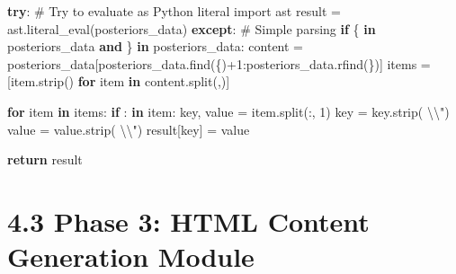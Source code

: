 \documentclass[
  11pt,
  letterpaper,
]{book}
\newenvironment{Shaded}{\begin{snugshade}}{\end{snugshade}}
\newcommand{\CharTok}[1]{\textcolor[rgb]{0.13,0.47,0.30}{#1}}
\newcommand{\CommentTok}[1]{\textcolor[rgb]{0.37,0.37,0.37}{#1}}
\newcommand{\ControlFlowTok}[1]{\textcolor[rgb]{0.00,0.23,0.31}{\textbf{#1}}}
\newcommand{\DecValTok}[1]{\textcolor[rgb]{0.68,0.00,0.00}{#1}}
\newcommand{\ImportTok}[1]{\textcolor[rgb]{0.00,0.46,0.62}{#1}}
\newcommand{\KeywordTok}[1]{\textcolor[rgb]{0.00,0.23,0.31}{\textbf{#1}}}
\newcommand{\NormalTok}[1]{\textcolor[rgb]{0.00,0.23,0.31}{#1}}
\newcommand{\OperatorTok}[1]{\textcolor[rgb]{0.37,0.37,0.37}{#1}}
\newcommand{\StringTok}[1]{\textcolor[rgb]{0.13,0.47,0.30}{#1}}
\begin{document}
\begin{Shaded}
\begin{Highlighting}[]
        \ControlFlowTok{try}\NormalTok{:}
            \CommentTok{\# Try to evaluate as Python literal}
            \ImportTok{import}\NormalTok{ ast}
\NormalTok{            result }\OperatorTok{=}\NormalTok{ ast.literal\_eval(posteriors\_data)}
        \ControlFlowTok{except}\NormalTok{:}
            \CommentTok{\# Simple parsing}
            \ControlFlowTok{if} \StringTok{\textquotesingle{}\{\textquotesingle{}} \KeywordTok{in}\NormalTok{ posteriors\_data }\KeywordTok{and} \StringTok{\textquotesingle{}\}\textquotesingle{}} \KeywordTok{in}\NormalTok{ posteriors\_data:}
\NormalTok{                content }\OperatorTok{=}\NormalTok{ posteriors\_data[posteriors\_data.find(}\StringTok{\textquotesingle{}\{\textquotesingle{}}\NormalTok{)}\OperatorTok{+}\DecValTok{1}\NormalTok{:posteriors\_data.rfind(}\StringTok{\textquotesingle{}\}\textquotesingle{}}\NormalTok{)]}
\NormalTok{                items }\OperatorTok{=}\NormalTok{ [item.strip() }\ControlFlowTok{for}\NormalTok{ item }\KeywordTok{in}\NormalTok{ content.split(}\StringTok{\textquotesingle{},\textquotesingle{}}\NormalTok{)]}

                \ControlFlowTok{for}\NormalTok{ item }\KeywordTok{in}\NormalTok{ items:}
                    \ControlFlowTok{if} \StringTok{\textquotesingle{}:\textquotesingle{}} \KeywordTok{in}\NormalTok{ item:}
\NormalTok{                        key, value }\OperatorTok{=}\NormalTok{ item.split(}\StringTok{\textquotesingle{}:\textquotesingle{}}\NormalTok{, }\DecValTok{1}\NormalTok{)}
\NormalTok{                        key }\OperatorTok{=}\NormalTok{ key.strip(}\StringTok{\textquotesingle{} }\CharTok{\textbackslash{}\textquotesingle{}\textbackslash{}"}\StringTok{\textquotesingle{}}\NormalTok{)}
\NormalTok{                        value }\OperatorTok{=}\NormalTok{ value.strip(}\StringTok{\textquotesingle{} }\CharTok{\textbackslash{}\textquotesingle{}\textbackslash{}"}\StringTok{\textquotesingle{}}\NormalTok{)}
\NormalTok{                        result[key] }\OperatorTok{=}\NormalTok{ value}

    \ControlFlowTok{return}\NormalTok{ result}
\end{Highlighting}
\end{Shaded}

\section{4.3 Phase 3: HTML Content Generation
Module}\label{phase-3-html-content-generation-module}
\end{document}
